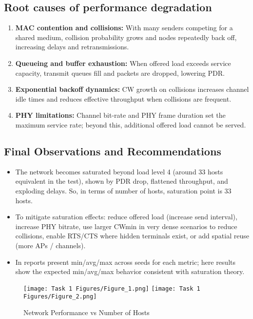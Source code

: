 \documentclass{rapport}
\begin{document}
\subsection{Root causes of performance degradation }
\begin{enumerate}
  \item \textbf{MAC contention and collisions:} With many senders competing for a shared medium, collision probability grows and nodes repeatedly back off, increasing delays and retransmissions.
  \item \textbf{Queueing and buffer exhaustion:} When offered load exceeds service capacity, transmit queues fill and packets are dropped, lowering PDR.
  \item \textbf{Exponential backoff dynamics:} CW growth on collisions increases channel idle times and reduces effective throughput when collisions are frequent.
  \item \textbf{PHY limitations:} Channel bit-rate and PHY frame duration set the maximum service rate; beyond this, additional offered load cannot be served.
\end{enumerate}

\subsection{Final Observations and Recommendations }
\begin{itemize}
  \item The network becomes saturated beyond load level 4 (around 33 hosts equivalent in the test), shown by PDR drop, flattened throughput, and exploding delays. So, in terms of number of hosts, saturation point is 33 hosts.
  \item To mitigate saturation effects: reduce offered load (increase send interval), increase PHY bitrate, use larger CWmin in very dense scenarios to reduce collisions, enable RTS/CTS where hidden terminals exist, or add spatial reuse (more APs / channels).
  \item In reports present min/avg/max across seeds for each metric; here results show the expected min/avg/max behavior consistent with saturation theory.
\end{itemize}

\begin{figure}[H]
  \centering
  \texttt{[image: Task 1 Figures/Figure\_1.png]}
  \texttt{[image: Task 1 Figures/Figure\_2.png]}
  \caption{Network Performance vs Number of Hosts}
  \label{fig:network_perf}
\end{figure}
\end{document}
